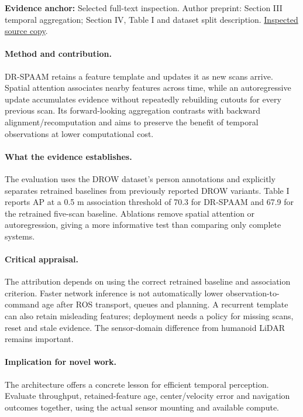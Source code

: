 \textbf{Evidence anchor:} Selected full-text inspection. Author preprint: Section III temporal aggregation; Section IV, Table I and dataset split description. \href{https://arxiv.org/pdf/2004.14079}{Inspected source copy}.

\paragraph{Method and contribution.} DR-SPAAM retains a feature template and updates it as new scans arrive. Spatial attention associates nearby features across time, while an autoregressive update accumulates evidence without repeatedly rebuilding cutouts for every previous scan. Its forward-looking aggregation contrasts with backward alignment/recomputation and aims to preserve the benefit of temporal observations at lower computational cost.

\paragraph{What the evidence establishes.} The evaluation uses the DROW dataset's person annotations and explicitly separates retrained baselines from previously reported DROW variants. Table I reports AP at a 0.5 m association threshold of 70.3 for DR-SPAAM and 67.9 for the retrained five-scan baseline. Ablations remove spatial attention or autoregression, giving a more informative test than comparing only complete systems.

\paragraph{Critical appraisal.} The attribution depends on using the correct retrained baseline and association criterion. Faster network inference is not automatically lower observation-to-command age after ROS transport, queues and planning. A recurrent template can also retain misleading features; deployment needs a policy for missing scans, reset and stale evidence. The sensor-domain difference from humanoid LiDAR remains important.

\paragraph{Implication for novel work.} The architecture offers a concrete lesson for efficient temporal perception. Evaluate throughput, retained-feature age, center/velocity error and navigation outcomes together, using the actual sensor mounting and available compute.

